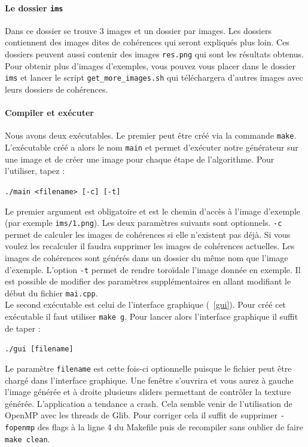 \documentclass[12pt]{article}
\begin{document}
\paragraph{Le dossier \texttt{ims}}
Dans ce dossier se trouve 3 images et un dossier par images. Les dossiers contiennent des images dites de cohérences qui seront expliqués plus loin. Ces dossiers peuvent aussi contenir des images \verb|res.png| qui sont les résultats obtenus. Pour obtenir plus d'images d'exemples, vous pouvez vous placer dans le dossier \verb|ims| et lancer le script \verb|get_more_images.sh| qui téléchargera d'autres images avec leurs dossiers de cohérences.

\paragraph{Compiler et exécuter}
Nous avons deux exécutables. Le premier peut être créé via la commande \verb|make|. L'exécutable créé a alors le nom \verb|main| et permet d'exécuter notre générateur sur une image et de créer une image pour chaque étape de l'algorithme. Pour l'utiliser, tapez :
\begin{center}
	\texttt{./main <filename> [-c] [-t]}
\end{center}
Le premier argument est obligatoire et est le chemin d'accès à l'image d'exemple (par exemple \verb|ims/1.png|). Les deux paramètres suivants sont optionnels. \verb|-c| permet de calculer les images de cohérences si elle n'existent pas déjà. Si vous voulez les recalculer il faudra supprimer les images de cohérences actuelles. Les images de cohérences sont générés dans un dossier du même nom que l'image d'exemple. L'option \verb|-t| permet de rendre toroïdale l'image donnée en exemple. Il est possible de modifier des paramètres supplémentaires en allant modifiant le début du fichier \verb|mai.cpp|. \\
Le second exécutable est celui de l'interface graphique (\figurename~\ref{gui}). Pour créé cet exécutable il faut utiliser \verb|make g|. Pour lancer alors l'interface graphique il suffit de taper :
\begin{center}
	\verb|./gui [filename]|
\end{center}
Le paramètre \verb|filename| est cette fois-ci optionnelle puisque le fichier peut être chargé dans l'interface graphique. Une fenêtre s'ouvrira et vous aurez à gauche l'image générée et à droite plusieurs sliders permettant de contrôler la texture générée. L'application a tendance a crash. Cela semble venir de l'utilisation de OpenMP avec les threads de Glib. Pour corriger cela il suffit de supprimer \verb|-fopenmp| des flags à la ligne 4 du Makefile puis de recompiler sans oublier de faire \verb|make clean|.
\end{document}
